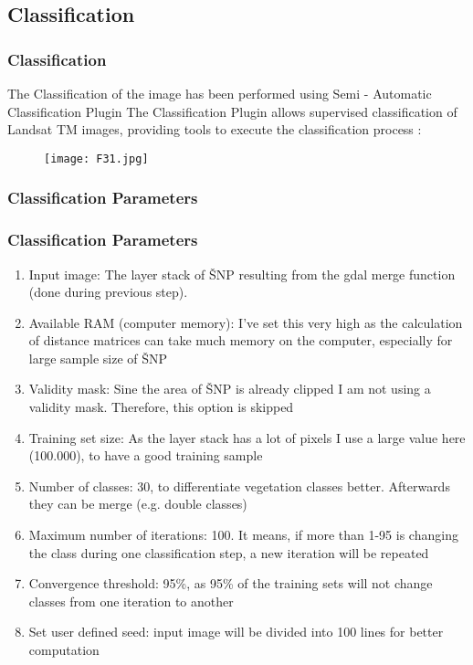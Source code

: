 \documentclass[pdflatex,compress,8pt,
	xcolor={dvipsnames,dvipsnames,svgnames,x11names,table},
	hyperref={
	breaklinks = true, 
	pdfauthor={Lemenkova Polina}, 
	pdfsubject={Preentation}, 
	pdfcreator={Lemenkova Polina}, 
	pdfproducer={Lemenkova Polina}, 
	colorlinks=true,linkcolor=blue, 
	citecolor=NavyBlue, 
	urlcolor = NavyBlue, 
	breaklinks = true}]{beamer}
\begin{document}
\subsection{Classification}
\begin{frame}\frametitle{Classification}
The Classification of the image has been performed using Semi - Automatic Classification Plugin
The Classification Plugin allows supervised classification of Landsat TM images, providing tools to execute the classification process :
\begin{figure}[H]
	\centering
		\texttt{[image: F31.jpg]}
\end{figure}
\end{frame}

\subsubsection{Classification Parameters}
\begin{frame}\frametitle{Classification Parameters}
\begin{enumerate}
	\item Input image: The layer stack of ŠNP resulting from the gdal merge function (done during previous step).
	\item Available RAM (computer memory): I’ve set this very high as the calculation of distance matrices can take much memory on the computer, especially for large sample size of ŠNP
	\item Validity mask: Sine the area of ŠNP is already clipped I am not using a validity mask. Therefore, this option is skipped
	\item Training set size: As the layer stack has a lot of pixels I use a large value here (100.000), to have a good training sample
	\item Number of classes: 30, to differentiate vegetation classes better. Afterwards they can be merge (e.g. double classes)
	\item Maximum number of iterations: 100. It means, if more than 1-95 is changing the class during one classification step, a new iteration will be repeated
	\item Convergence threshold: 95\%, as 95\% of the training sets will not change classes from one iteration to another
	\item Set user defined seed: input image will be divided into 100 lines for better computation
\end{enumerate}
\end{frame}
\end{document}
